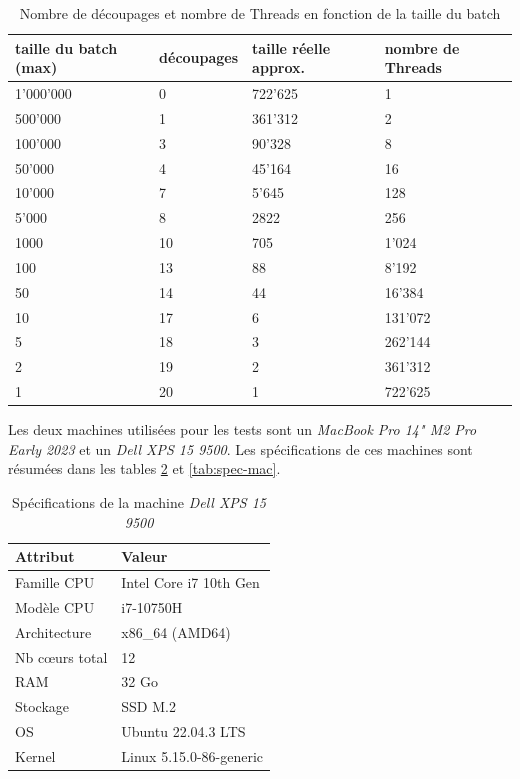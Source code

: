 \documentclass[
  french,
  a4paper,
]{scrartcl}
\begin{document}
\begin{table}[h]
  \centering
  \begin{tabular}{|l|l|l|l|}
    \hline
    \textbf{taille du batch (max)}  & \textbf{découpages} & \textbf{taille réelle approx.} & \textbf{nombre de Threads}\\
    \hline\hline
    1'000'000 & 0 & 722'625 & 1\\
    \hline
    500'000 & 1 & 361'312 & 2\\
    \hline
    100'000 & 3& 90'328 & 8\\
    \hline 
    50'000 & 4 & 45'164 & 16\\
    \hline
    10'000 & 7 & 5'645 & 128\\
    \hline
    5'000 & 8 & 2822 & 256\\
    \hline
    1000 & 10 & 705 & 1'024\\
    \hline
    100 & 13 & 88 & 8'192\\
    \hline 
    50 & 14 & 44 & 16'384\\
    \hline
    10 & 17 & 6 & 131'072\\
    \hline 
    5 & 18 & 3 & 262'144\\
    \hline
    2 & 19 & 2 & 361'312\\
    \hline
    1 & 20 & 1 & 722'625\\
    \hline
    
  \end{tabular}
  \caption{Nombre de découpages et nombre de Threads en fonction de la taille du batch}
  \label{tab:batch}
\end{table}


Les deux machines utilisées pour les tests sont un \textit{MacBook Pro 14" M2 Pro Early 2023} 
et un \textit{Dell XPS 15 9500}. Les spécifications de ces machines sont résumées dans 
les tables \ref{tab:spec-dell} et \ref{tab:spec-mac}.


\begin{table}[h]
  \centering
\begin{tabular}[pos]{|l|l|}
  \hline
  \textbf{Attribut} & \textbf{Valeur} \\
  \hline\hline
  Famille CPU & Intel Core i7 10th Gen \\
  \hline
  Modèle CPU & i7-10750H \\
  \hline
  Architecture & x86\_64 (AMD64)\\
  \hline
  Nb cœurs total & 12 \\
  \hline
  RAM & 32 Go \\
  \hline
  Stockage & SSD M.2\\
  \hline
  OS & Ubuntu 22.04.3 LTS\\
  \hline
  Kernel & Linux 5.15.0-86-generic\\
  \hline
\end{tabular}
\caption{Spécifications de la machine \textit{Dell XPS 15 9500}}
\label{tab:spec-dell}
\end{table}
  
\end{document}
